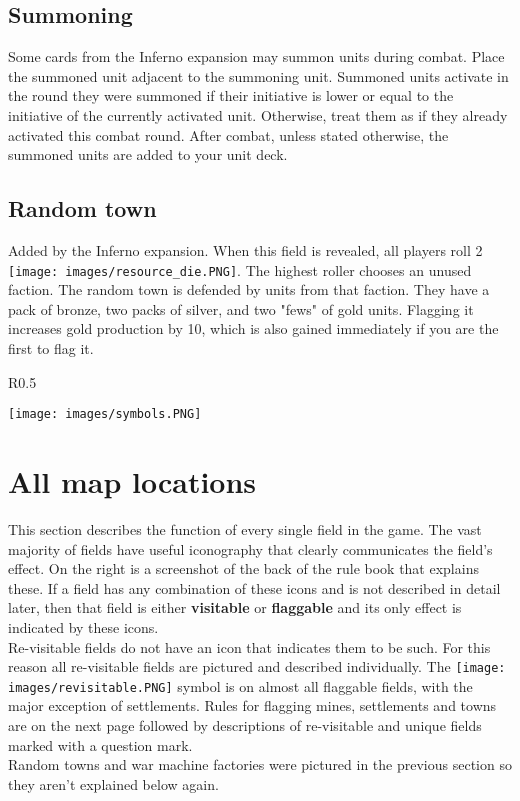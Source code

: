 \documentclass[12pt]{article}
\begin{document}
\subsection*{Summoning}
Some cards from the Inferno expansion may summon units during combat. Place the summoned unit adjacent to the summoning unit. Summoned units activate in the round they were summoned if their initiative is lower or equal to the initiative of the currently activated unit. Otherwise, treat them as if they already activated this combat round. After combat, unless stated otherwise, the summoned units are added to your unit deck.
\subsection*{Random town}
Added by the Inferno expansion. When this field is revealed, all players roll 2 \texttt{[image: images/resource\_die.PNG]}. The highest roller chooses an unused faction. The random town is defended by units from that faction. They have a pack of bronze, two packs of silver, and two "fews" of gold units. Flagging it increases gold production by 10, which is also gained immediately if you are the first to flag it.
\clearpage
\begin{wrapfigure}{R}{0.5\textwidth}
    \begin{center}
    \texttt{[image: images/symbols.PNG]}
    \end{center}
\end{wrapfigure}
\section[All map locations]{All map locations\hypertarget{All}{}}

This section describes the function of every single field in the game. The vast majority of fields have useful iconography that clearly communicates the field's effect. On the right is a screenshot of the back of the rule book that explains these. If a field has any combination of these icons and is not described in detail later, then that field is either \textbf{visitable} or \textbf{flaggable} and its only effect is indicated by these icons.\\[6pt]
Re-visitable fields do not have an icon that indicates them to be such. For this reason all re-visitable fields are pictured and described individually. The \texttt{[image: images/revisitable.PNG]} symbol is on almost all flaggable fields, with the major exception of settlements. Rules for flagging mines, settlements and towns are on the next page followed by descriptions of re-visitable and unique fields marked with a question mark.\\[6pt]
Random towns and war machine factories were pictured in the previous section so they aren't explained below again.
\end{document}
